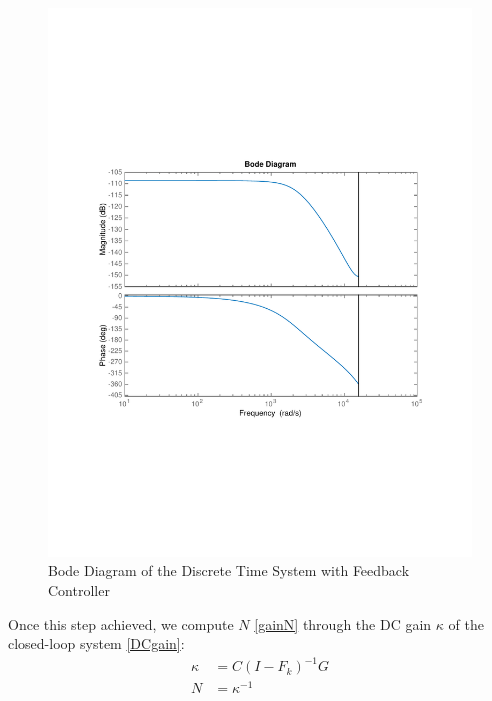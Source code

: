 \begin{figure}[H]
 \centering 
 \includegraphics[trim=2cm 7cm 2cm 7cm, clip=true, totalheight=0.35\textheight, angle=0]{figures/P15bodeLambda.pdf}
 \caption{Bode Diagram of the Discrete Time System with Feedback Controller}
 \label{fig:bodeLambda}
\end{figure}

Once this step achieved, we compute $N$ \eqref{gainN} through the DC gain $\kappa$ of the closed-loop system \eqref{DCgain}:
\begin{align}
\kappa &= C(I-F_k)^{-1}G \label{DCgain} \\
N &= \kappa^{-1} \label{gainN}
\end{align}

